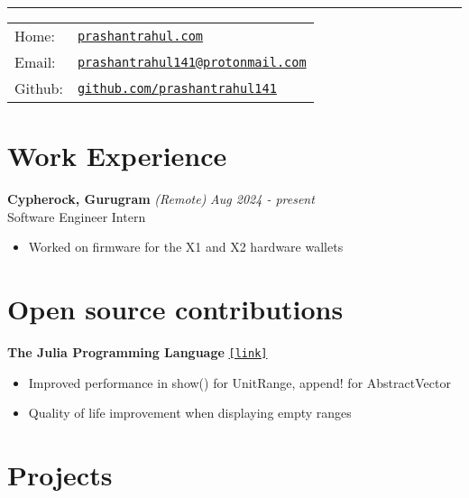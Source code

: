 \documentclass[a4paper,11pt]{article}
\begin{document}
 \vspace{0.5em}

\hrule\vspace{1em}

\noindent
\begin{tabular}{@{}l l}
Home: & \href{https://prashantrahul.com}{\texttt{prashantrahul.com}} \\
Email: & \href{mailto:prashantrahul141@protonmail.com}{\texttt{prashantrahul141@protonmail.com}} \\
Github: & \href{https://github.com/prashantrahul141}{\texttt{github.com/prashantrahul141}} \\
\end{tabular}

\section*{Work Experience}

\noindent\textbf{Cypherock, Gurugram} \textit{(Remote)} \hfill \textit{Aug 2024 - present}\\
\noindent Software Engineer Intern
\begin{itemize}[noitemsep, topsep=0pt]
    \item Worked on firmware for the X1 and X2 hardware wallets
\end{itemize}


\section*{Open source contributions}

\noindent\textbf{The Julia Programming Language} \hfill \href{https://github.com/JuliaLang/julia/issues?q=author%3Aprashantrahul141}{\texttt{[link]}}
\begin{itemize}[noitemsep, topsep=0pt]
    \item Improved performance in show() for UnitRange, append! for AbstractVector
    \item Quality of life improvement when displaying empty ranges \vspace{0.5em}
\end{itemize}


\section*{Projects}
\end{document}
